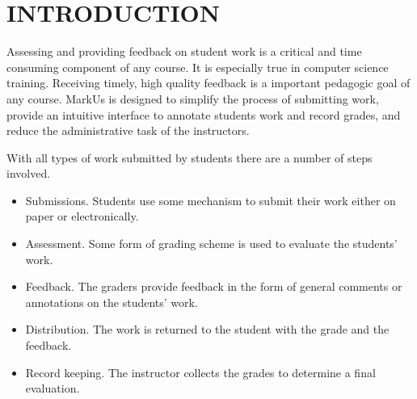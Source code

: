 \documentclass[twocolumn,10pt]{asme2e}
\begin{document}


\section*{INTRODUCTION}


Assessing and providing feedback on student work is a critical and time consuming component of any course. It is especially true in computer science training. Receiving timely, high quality feedback is a important pedagogic goal of any course. MarkUs is designed to simplify the process of submitting work, provide an intuitive interface to annotate students work and record grades, and reduce the administrative task of the instructors. 

With all types of work submitted by students there are a number of steps involved.

\begin{itemize}
        \item Submissions. Students use some mechanism to submit their work either on paper or electronically.
        \item Assessment.  Some form of grading scheme is used to evaluate the students' work.
        \item Feedback. The graders provide feedback in the form of general comments or annotations on the students' work.
        \item Distribution. The work is returned to the student with the grade and the feedback.
        \item Record keeping. The instructor collects the grades to determine a final evaluation.
\end{itemize}
\end{document}
